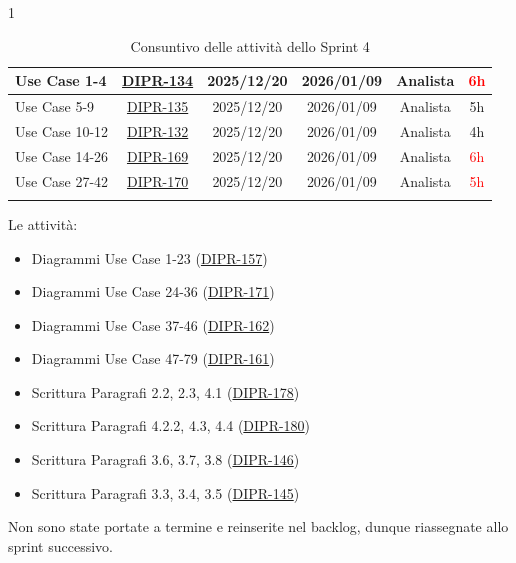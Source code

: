 \documentclass[a4paper,12pt]{article}
\begin{document}
\begin{spacing}{1}
\begin{longtable}{|p{4cm}|c|c|c|c|c|}
            \hline
            Use Case 1-4 & \href{https://7zpus.atlassian.net/browse/DIPR-134}{DIPR-134} & 2025/12/20 & 2026/01/09 & Analista & \textcolor{red}{6h}\\
            \hline
            Use Case 5-9 & \href{https://7zpus.atlassian.net/browse/DIPR-135}{DIPR-135} & 2025/12/20 & 2026/01/09 & Analista & 5h\\
            \hline
            Use Case 10-12 & \href{https://7zpus.atlassian.net/browse/DIPR-132}{DIPR-132} & 2025/12/20 & 2026/01/09 & Analista & \textcolor{green!50!black}{4h}\\
            \hline       
            Use Case 14-26& \href{https://7zpus.atlassian.net/browse/DIPR-169}{DIPR-169} & 2025/12/20 & 2026/01/09 & Analista & \textcolor{red}{6h} \\
            \hline
            Use Case 27-42& \href{https://7zpus.atlassian.net/browse/DIPR-170}{DIPR-170} & 2025/12/20 & 2026/01/09 & Analista & \textcolor{red}{5h} \\
            \hline
    \caption{Consuntivo delle attività dello Sprint 4}

        \end{longtable}
    \end{spacing}


Le attività:
    \begin{itemize}
        \item Diagrammi Use Case 1-23 (\href{https://7zpus.atlassian.net/browse/DIPR-157}{DIPR-157})
        \item Diagrammi Use Case 24-36 (\href{https://7zpus.atlassian.net/browse/DIPR-171}{DIPR-171})
        \item Diagrammi Use Case 37-46 (\href{https://7zpus.atlassian.net/browse/DIPR-162}{DIPR-162})
        \item Diagrammi Use Case 47-79 (\href{https://7zpus.atlassian.net/browse/DIPR-161}{DIPR-161})
        \item Scrittura Paragrafi 2.2, 2.3, 4.1 (\href{https://7zpus.atlassian.net/browse/DIPR-178}{DIPR-178})
        \item Scrittura Paragrafi 4.2.2, 4.3, 4.4 (\href{https://7zpus.atlassian.net/browse/DIPR-180}{DIPR-180})
        \item Scrittura Paragrafi 3.6, 3.7, 3.8 (\href{https://7zpus.atlassian.net/browse/DIPR-146}{DIPR-146})
        \item Scrittura Paragrafi 3.3, 3.4, 3.5 (\href{https://7zpus.atlassian.net/browse/DIPR-145}{DIPR-145})
    \end{itemize}
    Non sono state portate a termine e reinserite nel backlog, dunque riassegnate allo sprint successivo.\\
\end{document}
